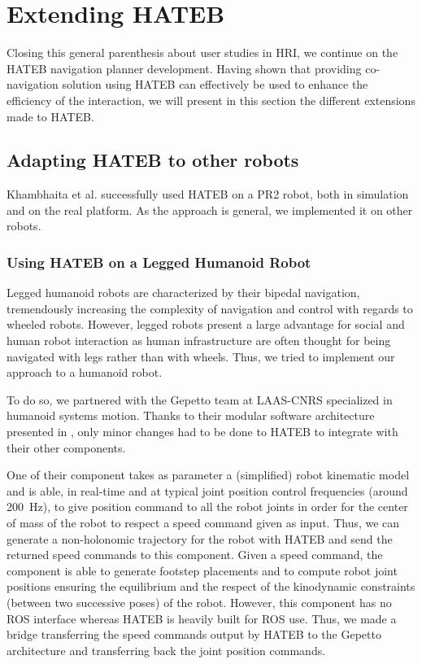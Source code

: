 \documentclass[a4paper,11pt,twoside]{StyleThese}
\begin{document}
\section{Extending HATEB}
Closing this general parenthesis about user studies in HRI, we continue on the HATEB navigation planner development. Having shown that providing co-navigation solution using HATEB can effectively be used to enhance the efficiency of the interaction, we will present in this section the different extensions made to HATEB.

\subsection{Adapting HATEB to other robots}
Khambhaita et al. \cite{khambhaita_head-body_2016} successfully used HATEB on a PR2 robot, both in simulation and on the real platform. As the approach is general, we implemented it on other robots.

\subsubsection{Using HATEB on a Legged Humanoid Robot}
Legged humanoid robots are characterized by their bipedal navigation, tremendously increasing the complexity of navigation and control with regards to wheeled robots. However, legged robots present a large advantage for social and human robot interaction as human infrastructure are often thought for being navigated with legs rather than with wheels. Thus, we tried to implement our approach to a humanoid robot.

To do so, we partnered with the Gepetto team at LAAS-CNRS specialized in humanoid systems motion. Thanks to their modular software architecture presented in \cite{stasse_modular_architecture_2008}, only minor changes had to be done to HATEB to integrate with their other components.

One of their component \cite{naveau_reactive_walking_2017} takes as parameter a (simplified) robot kinematic model and is able, in real-time and at typical joint position control frequencies (around 200~Hz), to give position command to all the robot joints in order for the center of mass of the robot to respect a speed command given as input. Thus, we can generate a non-holonomic trajectory for the robot with HATEB and send the returned speed commands to this component. Given a speed command, the component is able to generate footstep placements and to compute robot joint positions ensuring the equilibrium and the respect of the kinodynamic constraints (between two successive poses) of the robot. However, this component has no ROS interface whereas HATEB is heavily built for ROS use. Thus, we made a bridge transferring the speed commands output by HATEB to the Gepetto architecture and transferring back the joint position commands.
\end{document}
